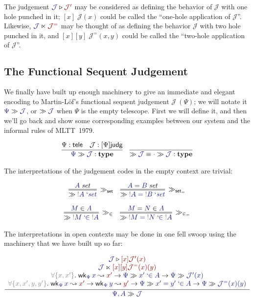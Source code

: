 \documentclass[acmtoplas]{acmtrans2m}
\def\InputModeColorName{MidnightBlue}
\def\OutputModeColorName{Maroon}
\newcommand\InputMode[1]{{\color{\InputModeColorName}{#1}}}
\newcommand\OutputMode[1]{{\color{\OutputModeColorName}{#1}}}
\newcommand\type{\mathbf{type}}
\newcommand\sorttele{\mathsf{tele}}
\newcommand\sortj{\mathsf{judg}}
\newcommand\sortoj[1]{[#1]\sortj}
\newcommand\nobind[1]{{\color{Gray}!}#1}
\newcommand\isset[1]{\InputMode{#1}\;\mathit{set}}
\newcommand\eqset[2]{\InputMode{#1}=\InputMode{#2}\;\mathit{set}}
\newcommand\mem[2]{\InputMode{#1}\in\InputMode{#2}}
\newcommand\eqmem[3]{\InputMode{#1}=\InputMode{#2}\in\InputMode{#3}}
\newcommand\lfpi[2]{{\color{Gray}\forall\{#1\}}.\;#2}
\newcommand\weaken[3]{\mathsf{wk}_{\InputMode{#1}}\,\InputMode{#2}\leadsto\OutputMode{#3}}
\newcommand\qisset[1]{#1\;`\mathit{set}}
\newcommand\qeqset[2]{#1=#2\;`\mathit{set}}
\newcommand\qmem[2]{#1\;`\!\!\in#2}
\newcommand\qeqmem[3]{#1=#2\;`\!\!\in#3}
\newcommand\sploot[2]{\InputMode{#1}\triangleright\OutputMode{#2}}
\newcommand\refract[2]{\InputMode{#1}\ltimes\OutputMode{#2}}
\newcommand\sequent[2]{\InputMode{#1}\gg\InputMode{#2}}
\newcommand\nece[1]{\gg\InputMode{#1}}
\newcommand\sequentruleset{\gg_\mathsf{set}}
\newcommand\sequentruleeqset{\gg_{\mathsf{set}_=}}
\newcommand\sequentrulemem{\gg_\in}
\newcommand\sequentruleeqmem{\gg_{\in_=}}
\newcommand\dname[1]{\mathcal{#1}}
\begin{document}
The judgement $\sploot{\dname{J}}{\dname{J}'}$ may be considered as
defining the behavior of $\dname{J}$ with one hole punched in it;
$[x]\;\dname{J}(x)$ could be called the ``one-hole application of
$\dname{J}$''. Likewise, $\refract{\dname{J}}{\dname{J}^=}$ may be
thought of as defining the behavior $\dname{J}$ with two hole punched
in it, and $[x][y]\; \dname{J}^=(x,y)$ could be called the ``two-hole
application of $\dname{J}$''.

\subsection{The Functional Sequent Judgement}

We finally have built up enough machinery to give an immediate and elegant
encoding to Martin-L\"of's functional sequent judgement $\dname{J}\ (\Psi)$;
we will notate it $\sequent{\Psi}{\dname{J}}$, or $\nece{\dname{J}}$ when
$\Psi$ is the empty telescope. First we will define it, and then we'll go back
and show some corresponding examples between our system and the informal rules
of MLTT~1979.

\begin{gather*}
  \infer{
    \sequent{\Psi}{\dname{J}}:\type
  }{
    \Psi:\sorttele &
    \dname{J}:\sortoj\Psi
  }
  \quad
  \infer{
    \nece{\dname{J}} \equiv \sequent{\cdot}{\dname{J}} : \type
  }{
  }
\end{gather*}

The interpretations of the judgement codes in the empty context are trivial:

\begin{gather*}
  \infer=[\sequentruleset]{
    \nece{\qisset{\nobind{A}}}
  }{
    \isset{A}
  }
  \quad
  \infer=[\sequentruleeqset]{
    \nece{\qeqset{\nobind{A}}{\nobind{B}}}
  }{
    \eqset{A}{B}
  }\\[6pt]
  \infer=[\sequentrulemem]{
    \nece{\qmem{\nobind{M}}{\nobind{A}}}
  }{
    \mem{M}{A}
  }
  \quad
  \infer=[\sequentruleeqmem]{
    \nece{\qeqmem{\nobind{M}}{\nobind{N}}{\nobind{A}}}
  }{
    \eqmem{M}{N}{A}
  }
\end{gather*}

The interpretations in open contexts may be done in one fell swoop using the
machinery that we have built up so far:

\begin{gather*}
  \infer{
    \sequent{\Psi,A}{\dname{J}}
  }{
    \begin{array}{c}
      \sploot{\dname{J}}{[x]\dname{J}'(x)}\\
      \refract{\dname{J}}{[x][y]\dname{J}^=(x)(y)}\\
      \lfpi{x,x'}{
        \weaken{\Psi}{x}{x'}
        \to\sequent{\Psi}{\qmem{x'}{A}}
        \to\sequent{\Psi}{\dname{J}'(x)}
      }\\
      \lfpi{x,x',y,y'}{
        \weaken{\Psi}{x}{x'}
        \to\weaken{\Psi}{y}{y'}
        \to\sequent{\Psi}{\qeqmem{x'}{y'}{A}}
        \to\sequent{\Psi}{\dname{J}^=(x)(y)}
      }\\
    \end{array}
  }
\end{gather*}
\end{document}
